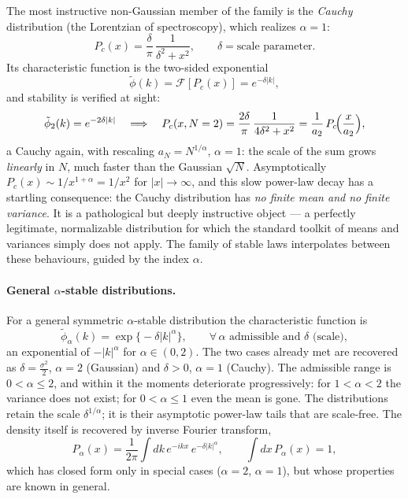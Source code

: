 The most instructive non-Gaussian member of the family is the \emph{Cauchy} distribution (the Lorentzian of spectroscopy), which realizes $\alpha=1$:
\begin{equation}
P_c(x) = \frac{\delta}{\pi}\,\frac{1}{\delta^2 + x^2}, \qquad \delta = \text{scale parameter}.
\end{equation}
Its characteristic function is the two-sided exponential
\begin{equation}
\tilde\phi(k) = \mathcal{F}[P_c(x)] = e^{-\delta|k|},
\end{equation}
and stability is verified at sight:
\begin{equation}
\tilde\phi_2(k) = e^{-2\delta|k|} \quad\Longrightarrow\quad P_c(x, N=2) = \frac{2\delta}{\pi}\,\frac{1}{4\delta^2+x^2} = \frac{1}{a_2}\,P_c\!\Bigl(\frac{x}{a_2}\Bigr),
\end{equation}
a Cauchy again, with rescaling $a_N = N^{1/\alpha}$, $\alpha=1$: the scale of the sum grows \emph{linearly} in $N$, much faster than the Gaussian $\sqrt{N}$.
Asymptotically $P_c(x) \sim 1/x^{1+\alpha} = 1/x^{2}$ for $|x|\to\infty$, and this slow power-law decay has a startling consequence: the Cauchy distribution has \emph{no finite mean and no finite variance}.
It is a pathological but deeply instructive object --- a perfectly legitimate, normalizable distribution for which the standard toolkit of means and variances simply does not apply.
The family of stable laws interpolates between these behaviours, guided by the index $\alpha$.

\paragraph*{General $\alpha$-stable distributions.}

For a general symmetric $\alpha$-stable distribution the characteristic function is
\begin{equation}
\tilde\phi_\alpha(k) = \exp\!\bigl\{-\delta|k|^\alpha\bigr\}, \qquad \forall\, \alpha \text{ admissible and } \delta \text{ (scale)},
\end{equation}
an exponential of $-|k|^\alpha$ for $\alpha\in(0,2)$.
The two cases already met are recovered as $\delta = \frac{\sigma^2}{2}$, $\alpha=2$ (Gaussian) and $\delta > 0$, $\alpha=1$ (Cauchy).
The admissible range is $0 < \alpha \le 2$, and within it the moments deteriorate progressively: for $1 < \alpha < 2$ the variance does not exist; for $0 < \alpha \le 1$ even the mean is gone.
The distributions retain the scale $\delta^{1/\alpha}$; it is their asymptotic power-law tails that are scale-free.
The density itself is recovered by inverse Fourier transform,
\begin{equation}
P_\alpha(x) = \frac{1}{2\pi}\int dk\, e^{-ikx}\, e^{-\delta|k|^\alpha}, \qquad \int dx\, P_\alpha(x) = 1,
\end{equation}
which has closed form only in special cases ($\alpha=2$, $\alpha=1$), but whose properties are known in general.

